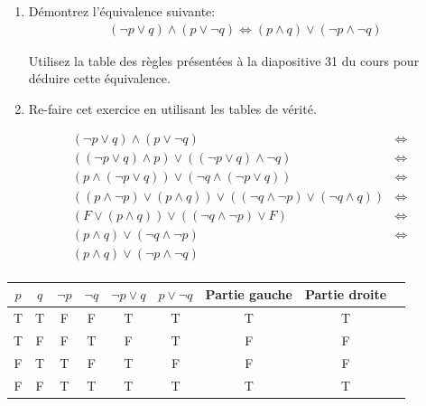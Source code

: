 \begin{Exercice}[7 minutes]
\begin{enumerate}
    \item 
 Démontrez l'équivalence suivante:
\begin{align*}
   (\neg p \vee q) \wedge (p \vee \neg q) \Leftrightarrow (p \wedge q) \vee (\neg p \wedge \neg q)
\end{align*}
\begin{conseil}
	Utilisez la table des règles présentées à la diapositive 31 du cours pour déduire cette équivalence. 
\end{conseil}
\item Re-faire cet exercice en utilisant les tables de vérité.
\end{enumerate}
\begin{solution}
   \begin{align*}
   & (\neg p \vee q) \wedge (p \vee \neg q) &\Leftrightarrow   \\
   & ((\neg p \vee q) \wedge p) \vee  ((\neg p \vee q) \wedge \neg q) &\Leftrightarrow  \tag{Distribution} \\
   & (p\wedge (\neg p \vee q)) \vee  ( \neg q \wedge (\neg p \vee q) ) &\Leftrightarrow  \tag{Commutativity} \\
   & ((p\wedge \neg p) \vee (p\wedge q)) \vee  ( (\neg q \wedge \neg p) \vee (\neg q \wedge q) )  &\Leftrightarrow \tag{Distribution} \\ 
   & (F \vee (p\wedge q)) \vee  ( (\neg q \wedge \neg p) \vee F)  &\Leftrightarrow \tag{Negation} \\
   & (p\wedge q) \vee  (\neg q \wedge \neg p)  &\Leftrightarrow \tag{Bound} \\
      & (p\wedge q) \vee  (\neg p \wedge \neg q )   \tag{Commutativity} \\
\end{align*}
    \end{solution}
    \begin{solution}
    \begin{center}
\renewcommand{\arraystretch}{1.2}
\begin{tabular}{|c|c||c|c|c|c||c|c||c|}
\hline
$p$ & $q$ & $\neg p$ & $\neg q$ & $\neg p \vee q$ & $p \vee \neg q$ & Partie gauche & Partie droite \\
\hline
T & T & F & F & T & T & T & T \\
T & F & F & T & F & T & F & F \\
F & T & T & F & T & F & F & F \\
F & F & T & T & T & T & T & T \\
\hline
\end{tabular}
\end{center}
    \end{solution}
    
\end{Exercice}

